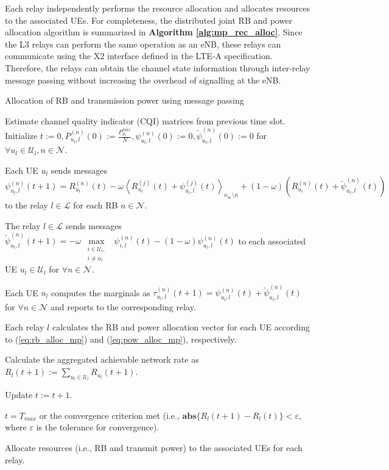 \documentclass[twocolumn,10pt]{IEEEtran}
\begin{document}
 Each relay independently performs the resource allocation and allocates
resources to the associated UEs. For completeness, the distributed joint RB and power allocation algorithm is summarized in \textbf{Algorithm \ref{alg:mp_rec_alloc}}. Since the L3 relays can perform the same operation as an eNB, these relays can communicate using the X2 interface
\cite{lte_arch} defined in the LTE-A specification. Therefore, the relays can obtain the channel state information through inter-relay message passing without increasing the overhead of signalling at the eNB.

\begin{algorithm*}
\caption{Allocation of RB and transmission power using message passing}
\label{alg:mp_rec_alloc}
\begin{algorithmic}[1]   


\STATE Estimate channel quality indicator (CQI) matrices from previous time slot.
\STATE Initialize $t:= 0, P_{u_l,l}^{(n)}(0) := \frac{P_{u_l}^{max}}{N} , \psi_{u_l, l}^{(n)}(0) :=0, \tilde{\psi}_{u_l, l}^{(n)}(0) :=0$ for $\forall u_l \in \mathcal{U}_l, n \in \mathcal{N}$.


\REPEAT 



\STATE Each UE $u_l$ sends messages $\psi_{u_l, l}^{(n)}(t+1) = R_{u_l}^{(n)}(t) - \omega \left\langle R_{u_l}^{(j)}(t) + \psi_{u_l, l}^{(j)}(t) \right\rangle_{\kappa_{u_l} \setminus n} + (1 - \omega) \left( R_{u_l}^{(n)}(t) + \tilde{\psi}_{u_l, l}^{(n)}(t) \right)$ to the relay $l \in \mathcal{L}$ for each RB $n \in \mathcal{N}$.

\STATE The relay $l \in \mathcal{L}$ sends messages $\tilde{\psi}_{u_l, l}^{(n)}(t+1) = - \omega ~\underset{\substack{i \in \mathcal{U}_l, \\  i \neq u_l}}{\operatorname \max} ~~ \psi_{i, l}^{(n)}(t) - (1 - \omega) \psi_{u_l, l}^{(n)}(t)$ to each associated UE $u_l \in \mathcal{U}_l$ for $\forall n \in \mathcal{N}$.

\STATE Each UE $u_l$ computes the marginals as $\tau_{u_l, l}^{(n)} (t+1) =  \psi_{u_l, l}^{(n)} (t) + \tilde{\psi}_{u_l, l}^{(n)} (t)$ for $\forall n \in \mathcal{N}$ and reports to the corresponding relay. 

\STATE Each relay $l$ calculates the RB and power allocation vector for each UE according to (\ref{eq:rb_alloc_mp}) and (\ref{eq:pow_alloc_mp}), respectively.

\STATE Calculate the aggregated achievable network rate as $R_l(t+1) := \displaystyle \sum_{u_l \in \mathcal{U}_l} R_{u_l}(t+1)$.   

\STATE Update $t:= t + 1$.

\UNTIL $t = T_{max}$ or the convergence criterion met (i.e., $ \mathbf{abs} \lbrace R_l(t+1) - R_l(t) \rbrace < \varepsilon$, where $\varepsilon$ is the  tolerance for convergence).

\STATE  Allocate resources (i.e., RB and transmit power) to the associated UEs for each relay. 

\end{algorithmic}
\end{algorithm*}
\end{document}
